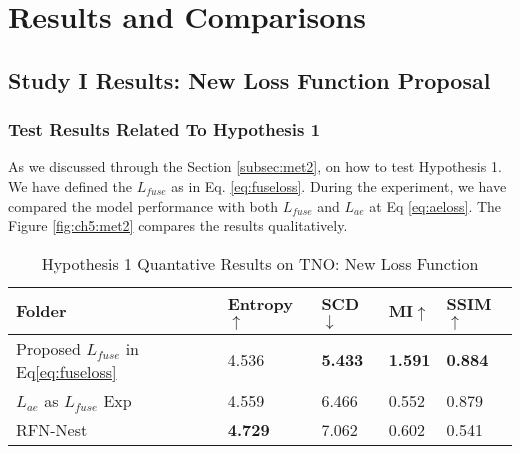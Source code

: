 \chapter{Results and Comparisons}
\label{chp:results}

\section{Study I Results: New Loss Function Proposal}\label{sec:study2res}

\subsection{Test Results Related To Hypothesis 1} \label{subsec:met2res}

As we discussed through the Section \ref{subsec:met2}, on how to test Hypothesis 1. We have defined the $L_{fuse}$ as in Eq. \ref{eq:fuseloss}. During the experiment, we have compared the model performance with both $L_{fuse}$ and $L_{ae}$ at Eq \ref{eq:aeloss}. The Figure \ref{fig:ch5:met2} compares the results qualitatively.

\begin{table}[htbp]
    \centering
    \caption{Hypothesis 1 Quantative Results on TNO: New Loss Function}
    \label{tab:ch5:met2}
    \begin{tabular}{|l|l|l|l|l|}
        \hline
        \textbf{Folder} & \textbf{Entropy\cite{roberts2008assessment}$\uparrow$ } & \textbf{SCD\cite{aslantas2015new}$\downarrow$} & \textbf{MI\cite{qu2002information}$\uparrow$} & \textbf{SSIM\cite{ma2015perceptual}$\uparrow$} \\ \hline
        Proposed $L_{fuse}$ in Eq\ref{eq:fuseloss}            & 4.536                & \textbf{5.433}       & \textbf{1.591}           & \textbf{0.884}             \\ \hline
        $L_{ae}$ as $L_{fuse}$ Exp            & 4.559                & 6.466       & 0.552           & 0.879             \\ \hline
        RFN-Nest\cite{li2021rfn}            & \textbf{4.729}                & 7.062       & 0.602           & 0.541             \\ \hline
    \end{tabular}
\end{table}

